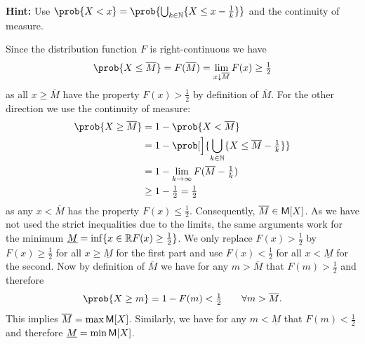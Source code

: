 \begin{exercise}
\begin{enumerate}[label=(\alph*), noitemsep]
        \textbf{Hint:} Use \(\prob{X < x} = \prob{\bigcup_{k\in \nat}\set{X \le x - \tfrac1k}}\) and the continuity of measure.
        \begin{solution}
            Since the distribution function \(F\) is right-continuous we have
            \[
                \prob{X \le \overline{M}} = F(\overline{M}) = \lim_{x \downarrow \overline{M}} F(x) \ge \tfrac12
            \]
            as all \(x \ge \overline{M}\) have the property \(F(x) > \tfrac12\) by
            definition of \(\overline{M}\). For the other direction we use the
            continuity of measure:
            \[\begin{aligned}
                \prob{X \ge \overline{M}}
                &= 1 - \prob{X < \overline{M}}
                \\
                &= 1- \prob[\Big]{\bigcup_{k\in \nat} \set{X \le \overline{M} - \tfrac1k}}
                \\
                &= 1 - \lim_{k\to \infty} F(\overline{M}-\tfrac1k)
                \\
                &\ge 1- \tfrac12 = \tfrac12
            \end{aligned}
            \]
            as any \(x< \overline{M}\) has the property \(F(x) \le \tfrac12\).
            Consequently, \(\overline{M} \in \mathsf{M}[X]\).
            As we have not used the strict inequalities due to the limits, the
            same arguments work for the minimum \(\underline{M} = \inf\{x\in
            \mathbb{R} F(x) \ge \tfrac12\}\). We only replace \(F(x) > \tfrac12\) by
            \(F(x) \ge \tfrac12\) for all \(x \ge \underline{M}\) for the first
            part and use \(F(x) < \tfrac12\) for all \(x < \underline{M}\) for
            the second. Now by definition of \(\overline{M}\) we have for any
            \(m > \overline{M}\) that \(F(m) > \tfrac12\) and therefore
            \[
                \prob{X \ge m} = 1 - F(m) < \tfrac12 \qquad \forall m > \overline{M}.
            \]
            This implies \(\overline{M} = \max \mathsf{M}[X]\).
            Similarly, we have for any \(m < \underline{M}\) that \(F(m) < \tfrac12\)
            and therefore \(\underline{M} = \min \mathsf{M}[X]\).
        \end{solution}


\end{enumerate}
\end{exercise}
